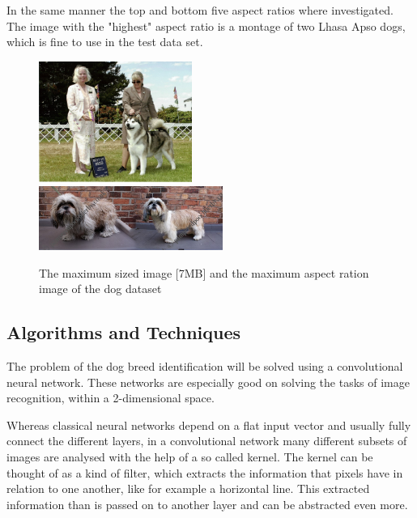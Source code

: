 \documentclass[paper=A4, DIV=10, parskip=half]{scrartcl}
\begin{document}
In the same manner the top and bottom five aspect ratios where investigated. The
image with the "highest" aspect ratio is a montage of two Lhasa Apso dogs, which
is fine to use in the test data set.

\begin{figure}
  \centering
  \includegraphics[width=5cm]{images/Alaskan_malamute_00366.jpg}
  \,
  \includegraphics[width=6cm]{images/Lhasa_apso_06668.jpg}
  \caption{The maximum sized image [7MB] and the maximum aspect ration image of the dog dataset}
  \label{dog_extreme}
\end{figure}


\subsection*{Algorithms and Techniques}

The problem of the dog breed identification will be solved using a convolutional
neural network. These networks are especially good on solving the tasks of image
recognition, within a 2-dimensional space. 

Whereas classical neural networks depend on a flat input vector and usually
fully connect the different layers, in a convolutional network many different
subsets of images are analysed with the help of a so called kernel. The kernel
can be thought of as a kind of filter, which extracts the information that
pixels have in relation to one another, like for example a horizontal line. This
extracted information than is passed on to another layer and can be abstracted
even more.
\end{document}
